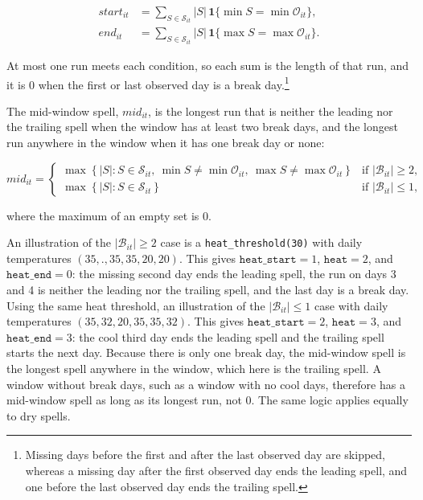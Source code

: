 \begin{align}
	\mathit{start}_{it} & = \sum_{S \in \mathcal{S}_{it}} |S| \, \mathbf{1}\{\min S = \min \mathcal{O}_{it}\} , \\
	\mathit{end}_{it} & = \sum_{S \in \mathcal{S}_{it}} |S| \, \mathbf{1}\{\max S = \max \mathcal{O}_{it}\} .
\end{align}

\noindent At most one run meets each condition, so each sum is the length of that run, and it is 0 when the first or last observed day is a break day.\footnote{Missing days before the first and after the last observed day are skipped, whereas a missing day after the first observed day ends the leading spell, and one before the last observed day ends the trailing spell.}

The mid-window spell, $\mathit{mid}_{it}$, is the longest run that is neither the leading nor the trailing spell when the window has at least two break days, and the longest run anywhere in the window when it has one break day or none:

\begin{equation}
	\mathit{mid}_{it} =
	\begin{cases}
		\max \left\{ |S| : S \in \mathcal{S}_{it},\ \min S \neq \min \mathcal{O}_{it},\ \max S \neq \max \mathcal{O}_{it} \right\} & \text{if } |\mathcal{B}_{it}| \geq 2 , \\
		\max \left\{ |S| : S \in \mathcal{S}_{it} \right\} & \text{if } |\mathcal{B}_{it}| \leq 1 ,
	\end{cases}
\end{equation}

\noindent where the maximum of an empty set is 0.  

An illustration of the $|\mathcal{B}_{it}| \geq 2$ case is a \texttt{heat\_threshold(30)} with daily temperatures $(35, ., 35, 35, 20, 20 )$. This gives $\texttt{heat\_start} = 1$, $\texttt{heat} = 2$, and $\texttt{heat\_end} = 0$: the missing second day ends the leading spell, the run on days 3 and 4 is neither the leading nor the trailing spell, and the last day is a break day. Using the same heat threshold, an illustration of the $|\mathcal{B}_{it}| \leq 1$ case with daily temperatures $(35, 32, 20, 35, 35, 32)$. This gives $\texttt{heat\_start} = 2$, $\texttt{heat} = 3$, and $\texttt{heat\_end} = 3$: the cool third day ends the leading spell and the trailing spell starts the next day. Because there is only one break day, the mid-window spell is the longest spell anywhere in the window, which here is the trailing spell. A window without break days, such as a window with no cool days, therefore has a mid-window spell as long as its longest run, not 0. The same logic applies equally to dry spells.

